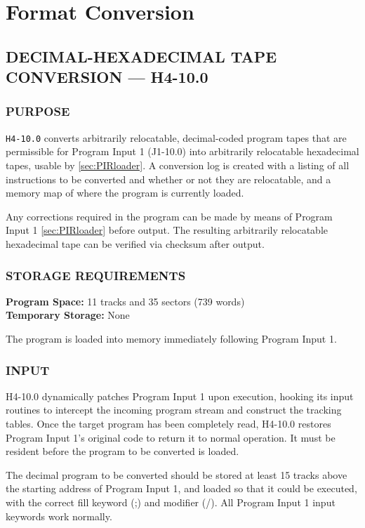\section{Format Conversion}

\label{sec:tape-conversion}
\subsection*{DECIMAL-HEXADECIMAL TAPE CONVERSION --- H4-10.0}

\subsubsection*{PURPOSE}
\texttt{H4-10.0} converts arbitrarily relocatable, decimal-coded program tapes that are permissible for Program Input 1 (J1-10.0) into arbitrarily relocatable hexadecimal tapes, usable by \ref{sec:PIRloader}. A conversion log is created with a listing of all instructions to be converted and whether or not they are relocatable, and a memory map of where the program is currently loaded.

Any corrections required in the program can be made by means of Program Input 1 \ref{sec:PIRloader} before output. The resulting arbitrarily relocatable hexadecimal tape can be verified via checksum after output.

\subsubsection*{STORAGE REQUIREMENTS}
\textbf{Program Space:} 11 tracks and 35 sectors (739 words) \\
\textbf{Temporary Storage:} None

The program is loaded into memory immediately following Program Input 1.

\subsubsection*{INPUT}
H4-10.0 dynamically patches Program Input 1 upon execution, hooking its input routines to intercept the incoming program stream and construct the tracking tables. Once the target program has been completely read, H4-10.0 restores Program Input 1's original code to return it to normal operation. It must be resident before the program to be converted is loaded.

The decimal program to be converted should be stored at least 15 tracks above the starting address of Program Input 1, and loaded so that it could be executed, with the correct fill keyword (;) and modifier (/). All Program Input 1 input keywords work normally.


